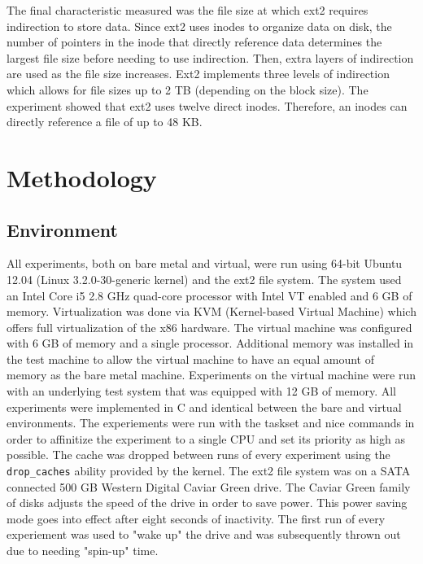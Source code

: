 \documentclass[letterpaper,twocolumn,10pt]{article}
\begin{document}
The final characteristic measured was the file size at which ext2 requires indirection to store data. 
Since ext2 uses inodes to organize data on disk, the number of pointers in the inode that directly reference data determines the largest file size before needing to use indirection. 
Then, extra layers of indirection are used as the file size increases. 
Ext2 implements three levels of indirection which allows for file sizes up to 2 TB (depending on the block size). 
The experiment showed that ext2 uses twelve direct inodes. 
Therefore, an inodes can directly reference a file of up to 48 KB. 

\section{Methodology}
\subsection{Environment}
All experiments, both on bare metal and virtual, were run using 64-bit Ubuntu 12.04 (Linux 3.2.0-30-generic kernel) and the ext2 file system.
The system used an Intel Core i5 2.8 GHz quad-core processor with Intel VT enabled and 6 GB of memory.
Virtualization was done via KVM (Kernel-based Virtual Machine) which offers full virtualization of the x86 hardware.
The virtual machine was configured with 6 GB of memory and a single processor.
Additional memory was installed in the test machine to allow the virtual machine to have an equal amount of memory as the bare metal machine.
Experiments on the virtual machine were run with an underlying test system that was equipped with 12 GB of memory.
All experiments were implemented in C and identical between the bare and virtual environments. 
The experiements were run with the taskset and nice commands in order to affinitize the experiment to a single CPU and set its priority as high as possible.
The cache was dropped between runs of every experiment using the \texttt{drop\_caches} ability provided by the kernel.
The ext2 file system was on a SATA connected 500 GB Western Digital Caviar Green drive. 
The Caviar Green family of disks adjusts the speed of the drive in order to save power. 
This power saving mode goes into effect after eight seconds of inactivity.
The first run of every experiement was used to "wake up" the drive and was subsequently thrown out due to needing "spin-up" time. 
\end{document}
